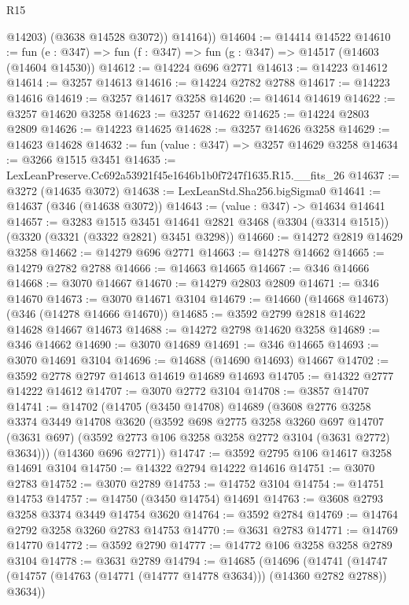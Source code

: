 \begin{lexlean}{R15}
\begin{coremodule}
            @14203)
          (@3638 @14528 @3072))
        @14164))
@14604 := @14414 @14522
@14610 := fun (e : @347) => fun (f : @347) => fun (g : @347) => @14517 (@14603 (@14604 @14530))
@14612 := @14224 @696 @2771
@14613 := @14223 @14612
@14614 := @3257 @14613
@14616 := @14224 @2782 @2788
@14617 := @14223 @14616
@14619 := @3257 @14617 @3258
@14620 := @14614 @14619
@14622 := @3257 @14620 @3258
@14623 := @3257 @14622
@14625 := @14224 @2803 @2809
@14626 := @14223 @14625
@14628 := @3257 @14626 @3258
@14629 := @14623 @14628
@14632 := fun (value : @347) => @3257 @14629 @3258
@14634 := @3266 @1515 @3451
@14635 := LexLeanPreserve.Cc692a53921f45e1646b1b0f7247f1635.R15.__fits_26
@14637 := @3272 (@14635 @3072)
@14638 := LexLeanStd.Sha256.bigSigma0
@14641 := @14637 (@346 (@14638 @3072))
@14643 := (value : @347) -> @14634 @14641
@14657 := @3283
    @1515
    @3451
    @14641
    @2821
    @3468
    (@3304 (@3314 @1515))
    (@3320 (@3321 (@3322 @2821) @3451 @3298))
@14660 := @14272 @2819 @14629 @3258
@14662 := @14279 @696 @2771
@14663 := @14278 @14662
@14665 := @14279 @2782 @2788
@14666 := @14663 @14665
@14667 := @346 @14666
@14668 := @3070 @14667
@14670 := @14279 @2803 @2809
@14671 := @346 @14670
@14673 := @3070 @14671 @3104
@14679 := @14660 (@14668 @14673) (@346 (@14278 @14666 @14670))
@14685 := @3592 @2799 @2818 @14622 @14628 @14667 @14673
@14688 := @14272 @2798 @14620 @3258
@14689 := @346 @14662
@14690 := @3070 @14689
@14691 := @346 @14665
@14693 := @3070 @14691 @3104
@14696 := @14688 (@14690 @14693) @14667
@14702 := @3592 @2778 @2797 @14613 @14619 @14689 @14693
@14705 := @14322 @2777 @14222 @14612
@14707 := @3070 @2772 @3104
@14708 := @3857 @14707
@14741 := @14702
    (@14705
      (@3450 @14708)
      @14689
      (@3608
        @2776
        @3258
        @3374
        @3449
        @14708
        @3620
        (@3592
          @698
          @2775
          @3258
          @3260
          @697
          @14707
          (@3631 @697)
          (@3592 @2773 @106 @3258 @3258 @2772 @3104 (@3631 @2772) @3634)))
      (@14360 @696 @2771))
@14747 := @3592 @2795 @106 @14617 @3258 @14691 @3104
@14750 := @14322 @2794 @14222 @14616
@14751 := @3070 @2783
@14752 := @3070 @2789
@14753 := @14752 @3104
@14754 := @14751 @14753
@14757 := @14750 (@3450 @14754) @14691
@14763 := @3608 @2793 @3258 @3374 @3449 @14754 @3620
@14764 := @3592 @2784
@14769 := @14764 @2792 @3258 @3260 @2783 @14753
@14770 := @3631 @2783
@14771 := @14769 @14770
@14772 := @3592 @2790
@14777 := @14772 @106 @3258 @3258 @2789 @3104
@14778 := @3631 @2789
@14794 := @14685
    (@14696
      (@14741 (@14747 (@14757 (@14763 (@14771 (@14777 @14778 @3634))) (@14360 @2782 @2788)) @3634))

\end{coremodule}
\end{lexlean}
